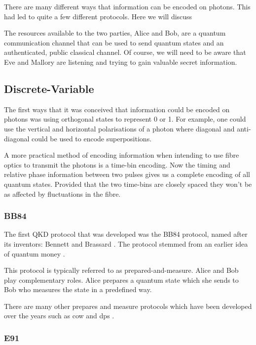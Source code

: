 There are many different ways that information can be encoded on photons. This had led to quite a few different protocols. Here we will discuss 

The resources available to the two parties, Alice and Bob, are a quantum communication channel that can be used to send quantum states and an authenticated, public classical channel. Of course, we will need to be aware that Eve and Mallory are listening and trying to gain valuable secret information.

\subsection{Discrete-Variable}

The first ways that it was conceived that information could be encoded on photons was using orthogonal states to represent 0 or 1. For example, one could use the vertical and horizontal polarisations of a photon where diagonal and anti-diagonal could be used to encode superpositions. 

A more practical method of encoding information when intending to use fibre optics to transmit the photons is a time-bin encoding. Now the timing and relative phase information between two pulses gives us a complete encoding of all quantum states. Provided that the two time-bins are closely spaced they won't be as affected by fluctuations in the fibre.

\subsubsection*{BB84}

The first \ac{QKD} protocol that was developed was the BB84 protocol, named after its inventors: Bennett and Brassard \cite{BB84}. The protocol stemmed from an earlier idea of quantum money \cite{quantum_money}.

This protocol is typically referred to as {\color{bristol-red}prepared-and-measure}. Alice and Bob play complementary roles. Alice {\color{bristol-red}prepares} a quantum state which she sends to Bob who {\color{bristol-red}measures} the state in a predefined way. 

There are many other prepares and measure protocols which have been developed over the years such as \ac{cow} \cite{COW-QKD} and \ac{dps} \cite{DPS-QKD}.

\subsubsection*{E91}

